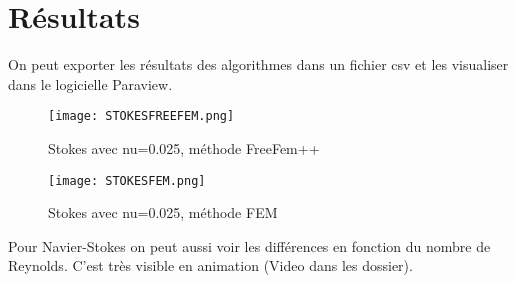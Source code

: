 \section{Résultats}
On peut exporter les résultats des algorithmes dans un fichier csv et les visualiser dans le logicielle Paraview.

\begin{figure}[H]
\centering
\texttt{[image: STOKESFREEFEM.png]} \caption{Stokes avec nu=0.025, méthode FreeFem++}
\label{freefem}
\end{figure}

\begin{figure}[H]
\centering
\texttt{[image: STOKESFEM.png]} \caption{Stokes avec nu=0.025, méthode FEM}
\label{fem}
\end{figure}

Pour Navier-Stokes on peut aussi voir les différences en fonction du nombre de Reynolds.
C'est très visible en animation (Video dans les dossier).

